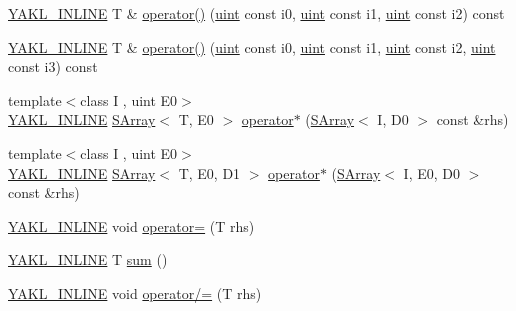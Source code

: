 \begin{DoxyCompactItemize}
\item 
\hyperlink{YAKL_8h_aa0dd629ffce6d564b19e9313fb91a5ad}{Y\+A\+K\+L\+\_\+\+I\+N\+L\+I\+NE} T \& \hyperlink{classyakl_1_1SArray_a0c45c587a44fd0bf390a8e2c809fce36}{operator()} (\hyperlink{classyakl_1_1SArray_a777ad93441c16e786309b27e40bc56f0}{uint} const i0, \hyperlink{classyakl_1_1SArray_a777ad93441c16e786309b27e40bc56f0}{uint} const i1, \hyperlink{classyakl_1_1SArray_a777ad93441c16e786309b27e40bc56f0}{uint} const i2) const
\item 
\hyperlink{YAKL_8h_aa0dd629ffce6d564b19e9313fb91a5ad}{Y\+A\+K\+L\+\_\+\+I\+N\+L\+I\+NE} T \& \hyperlink{classyakl_1_1SArray_adc1f1d0c5d5674f6a6d0215ac1042219}{operator()} (\hyperlink{classyakl_1_1SArray_a777ad93441c16e786309b27e40bc56f0}{uint} const i0, \hyperlink{classyakl_1_1SArray_a777ad93441c16e786309b27e40bc56f0}{uint} const i1, \hyperlink{classyakl_1_1SArray_a777ad93441c16e786309b27e40bc56f0}{uint} const i2, \hyperlink{classyakl_1_1SArray_a777ad93441c16e786309b27e40bc56f0}{uint} const i3) const
\item 
{\footnotesize template$<$class I , uint E0$>$ }\\\hyperlink{YAKL_8h_aa0dd629ffce6d564b19e9313fb91a5ad}{Y\+A\+K\+L\+\_\+\+I\+N\+L\+I\+NE} \hyperlink{classyakl_1_1SArray}{S\+Array}$<$ T, E0 $>$ \hyperlink{classyakl_1_1SArray_a5d2efa2ff50772e96b90bee0edccb754}{operator$\ast$} (\hyperlink{classyakl_1_1SArray}{S\+Array}$<$ I, D0 $>$ const \&rhs)
\item 
{\footnotesize template$<$class I , uint E0$>$ }\\\hyperlink{YAKL_8h_aa0dd629ffce6d564b19e9313fb91a5ad}{Y\+A\+K\+L\+\_\+\+I\+N\+L\+I\+NE} \hyperlink{classyakl_1_1SArray}{S\+Array}$<$ T, E0, D1 $>$ \hyperlink{classyakl_1_1SArray_ac95650b78dde3d4dc8acacf8e7ded37f}{operator$\ast$} (\hyperlink{classyakl_1_1SArray}{S\+Array}$<$ I, E0, D0 $>$ const \&rhs)
\item 
\hyperlink{YAKL_8h_aa0dd629ffce6d564b19e9313fb91a5ad}{Y\+A\+K\+L\+\_\+\+I\+N\+L\+I\+NE} void \hyperlink{classyakl_1_1SArray_a8e0ffa1cc8b0d8df755ca6770b8d86b0}{operator=} (T rhs)
\item 
\hyperlink{YAKL_8h_aa0dd629ffce6d564b19e9313fb91a5ad}{Y\+A\+K\+L\+\_\+\+I\+N\+L\+I\+NE} T \hyperlink{classyakl_1_1SArray_a9aeae1af2546e29153e0e3427b3390d4}{sum} ()
\item 
\hyperlink{YAKL_8h_aa0dd629ffce6d564b19e9313fb91a5ad}{Y\+A\+K\+L\+\_\+\+I\+N\+L\+I\+NE} void \hyperlink{classyakl_1_1SArray_a63e1d2d8393b5762cd4f01660446ec76}{operator/=} (T rhs)
\item 

\end{DoxyCompactItemize}
